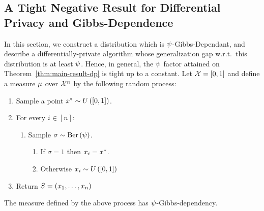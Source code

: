\documentclass[12pt,a4paper,oneside,onecolumn]{book}
\begin{document}
\subsection[A Tight Negative Result]{A Tight Negative Result for Differential Privacy and Gibbs-Dependence}

In this section, we construct a distribution which is $\psi$-Gibbs-Dependant,
and describe a differentially-private algorithm whose generalization gap w.r.t.\ this distribution is at least $\psi$.
Hence, in general, the $\psi$ factor attained on Theorem~\ref{thm:main-result-dp} is tight up to a constant.
Let $\mathcal{X}=[0,1]$ and define a measure $\mu$ over $\mathcal{X}^n$ by the following random process:
\begin{enumerate}[itemsep=0pt]
\item Sample a point $x^*\sim U\left([0,1]\right)$.
\item For every $i \in [n]:$ 
  \begin{enumerate}
  \item Sample $\sigma \sim {\rm Ber}\left(\psi\right)$.
    \begin{enumerate}
    \item If $\sigma = 1$ then $x_i = x^*$.
    \item Otherwise $x_i \sim U\left([0,1]\right)$
    \end{enumerate}
  \end{enumerate}
  
\item Return $S = \left(x_1,\ldots,x_n\right)$
\end{enumerate}

\begin{lemma}
  \label{lem:negative-1}
  The measure defined by the above process
  has $\psi$-Gibbs-dependency.
\end{lemma}
\end{document}
